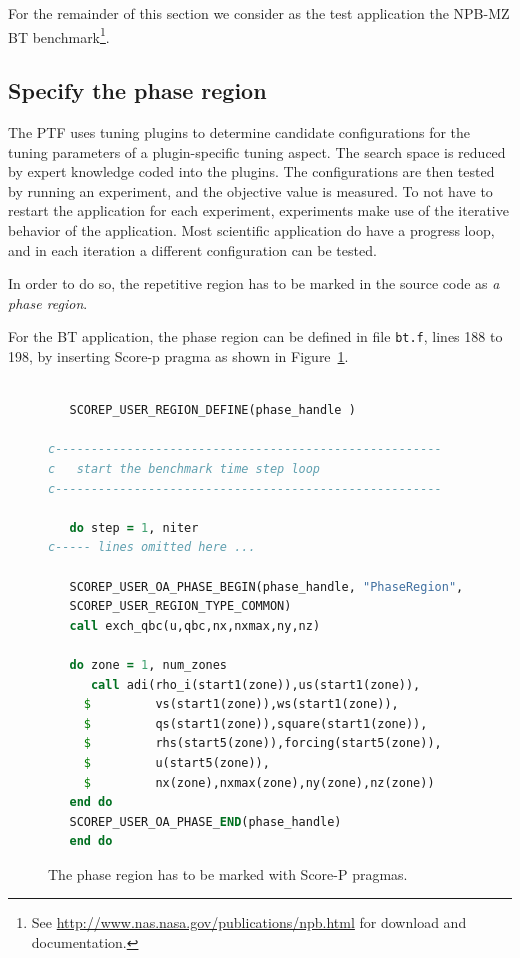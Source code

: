 \documentclass[11pt,oneside,a4paper]{book}
\newcommand{\comment}[1]{\marginpar{\scriptsize{\textcolor{red}{#1}}}}
\begin{document}
For the remainder of this section we consider as the test application the NPB-MZ BT benchmark\footnote{See \url{http://www.nas.nasa.gov/publications/npb.html} for download and documentation.}. \comment{Make it a preconfigured test provided with PTF}

\subsection{Specify the phase region}

The PTF uses tuning plugins to determine candidate configurations for the tuning parameters of a plugin-specific tuning aspect. The search space is reduced by expert knowledge coded into the plugins. The configurations are then tested by running an experiment, and the objective value is measured. To not have to restart the application for each experiment, experiments make use of the iterative behavior of the application. Most scientific application do have a progress loop, and in each iteration a different configuration can be tested.

In order to do so, the repetitive region has to be marked in the source code as \textit{a phase region}. 

For the BT application, the phase region can be defined in file \texttt{bt.f}, lines 188 to 198, by inserting Score-p pragma as shown in Figure~\ref{fig:phase}.

\begin{figure}

\begin{lstlisting}[language=Fortran]

   SCOREP_USER_REGION_DEFINE(phase_handle )
   
c------------------------------------------------------
c   start the benchmark time step loop
c------------------------------------------------------

   do step = 1, niter
c----- lines omitted here ...

   SCOREP_USER_OA_PHASE_BEGIN(phase_handle, "PhaseRegion",
   SCOREP_USER_REGION_TYPE_COMMON)
   call exch_qbc(u,qbc,nx,nxmax,ny,nz)
		
   do zone = 1, num_zones
      call adi(rho_i(start1(zone)),us(start1(zone)),
     $         vs(start1(zone)),ws(start1(zone)),
     $         qs(start1(zone)),square(start1(zone)),
     $         rhs(start5(zone)),forcing(start5(zone)),
     $         u(start5(zone)),
     $         nx(zone),nxmax(zone),ny(zone),nz(zone))
   end do
   SCOREP_USER_OA_PHASE_END(phase_handle)
   end do
\end{lstlisting}
\caption{The phase region has to be marked with Score-P pragmas.}
\label{fig:phase}
\end{figure}
\end{document}
